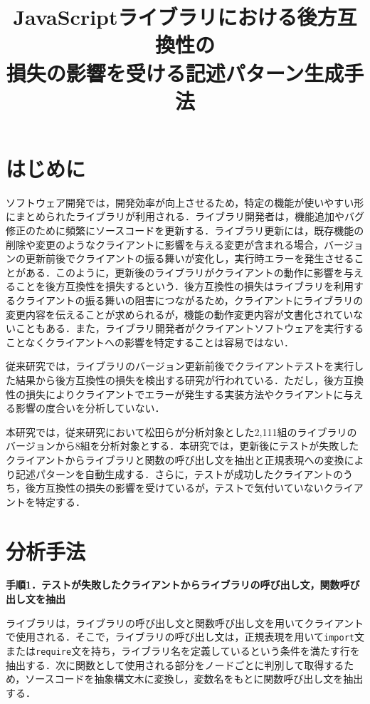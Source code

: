 \documentclass[twocolumn]{jarticle} %
\title{JavaScriptライブラリにおける後方互換性の\\損失の影響を受ける記述パターン生成手法}
\begin{document}
\maketitle
\thispagestyle{empty} %



\section{はじめに}

ソフトウェア開発では，開発効率が向上させるため，特定の機能が使いやすい形にまとめられたライブラリが利用される．ライブラリ開発者は，機能追加やバグ修正のために頻繁にソースコードを更新する．ライブラリ更新には，既存機能の削除や変更のようなクライアントに影響を与える変更が含まれる場合，バージョンの更新前後でクライアントの振る舞いが変化し，実行時エラーを発生させることがある．このように，更新後のライブラリがクライアントの動作に影響を与えることを後方互換性を損失するという．後方互換性の損失はライブラリを利用するクライアントの振る舞いの阻害につながるため，クライアントにライブラリの変更内容を伝えることが求められるが，機能の動作変更内容が文書化されていないこともある\cite{UnderstandingWild}．また，ライブラリ開発者がクライアントソフトウェアを実行することなくクライアントへの影響を特定することは容易ではない．

従来研究では，ライブラリのバージョン更新前後でクライアントテストを実行した結果から後方互換性の損失を検出する研究が行われている\cite{mujahid}．ただし，後方互換性の損失によりクライアントでエラーが発生する実装方法やクライアントに与える影響の度合いを分析していない．

本研究では，従来研究において松田ら\cite{matsuda}が分析対象とした2,111組のライブラリのバージョンから8組を分析対象とする．本研究では，更新後にテストが失敗したクライアントからライブラリと関数の呼び出し文を抽出と正規表現への変換により記述パターンを自動生成する．さらに，テストが成功したクライアントのうち，後方互換性の損失の影響を受けているが，テストで気付いていないクライアントを特定する．
\section{分析手法}
\noindent\textbf{手順1．テストが失敗したクライアントからライブラリの呼び出し文，関数呼び出し文を抽出}

ライブラリは，ライブラリの呼び出し文と関数呼び出し文を用いてクライアントで使用される．そこで，ライブラリの呼び出し文は，正規表現を用いて\texttt{import}文または\texttt{require}文を持ち，ライブラリ名を定義しているという条件を満たす行を抽出する．次に関数として使用される部分をノードごとに判別して取得するため，ソースコードを抽象構文木に変換し，変数名をもとに関数呼び出し文を抽出する．
\end{document}
